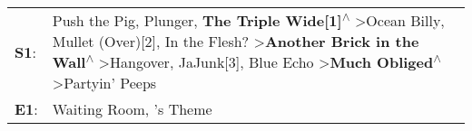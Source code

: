 \begin{supertabular}{p{0.03\textwidth}p{0.92\textwidth}}
 \textbf{S1}:  &  Push the Pig\textsuperscript{}, \enspace Plunger\textsuperscript{}, \enspace \textbf{The Triple Wide[1]\textsuperscript{$\wedge$}} \textgreater \enspace Ocean Billy\textsuperscript{}, \enspace Mullet (Over)[2]\textsuperscript{}, \enspace In the Flesh?\textsuperscript{} \textgreater \enspace \textbf{Another Brick in the Wall\textsuperscript{$\wedge$}} \textgreater \enspace Hangover\textsuperscript{}, \enspace JaJunk[3]\textsuperscript{}, \enspace Blue Echo\textsuperscript{} \textgreater \enspace \textbf{Much Obliged\textsuperscript{$\wedge$}} \textgreater \enspace Partyin' Peeps\textsuperscript{}  \enspace  \\
 \textbf{E1}:  &                                                                                                                                                                                                                                                                                                                                                                                                                                                                                                                                                       Waiting Room\textsuperscript{}, 's Theme\textsuperscript{}  \enspace  \\
\end{supertabular}
